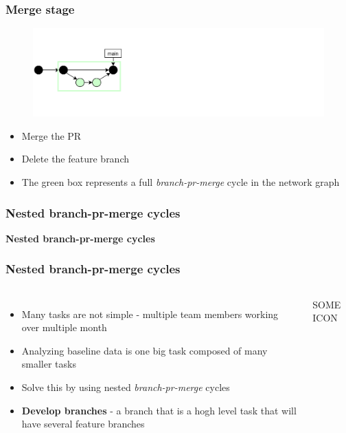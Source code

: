 \documentclass[aspectratio=169]{beamer} %
\begin{document}
\begin{frame}
	\frametitle{Merge stage}
	
	\vspace{-.5cm}
	\begin{minipage}[t][5cm][t]{\textwidth}
		\begin{figure}
			\centering
			\includegraphics[width=\textwidth]{./img/dime-gitflow-network-1-3.png}
		\end{figure}
	\end{minipage}  
	
	\vspace{-.5cm}
	\begin{minipage}[t][5cm][t]{\textwidth}
		\begin{itemize}
			\setlength\itemsep{.5em}
			\item Merge the PR
			\item Delete the feature branch
			\item The green box represents a full \textit{branch-pr-merge} cycle in the network graph
		\end{itemize}
	\end{minipage}  
	
\end{frame}

\begin{frame}
	\frametitle{Nested branch-pr-merge cycles}
	
	\huge\centering \textbf{Nested branch-pr-merge cycles}
	
\end{frame}

\begin{frame}
	\frametitle{Nested branch-pr-merge cycles}
	\begin{columns}[c]
		
		\begin{itemize}
			\setlength\itemsep{.5em}
			\item Many tasks are not simple - multiple team members working over multiple month
			\item Analyzing baseline data is one big task composed of many smaller tasks
			\item Solve this by using nested \textit{branch-pr-merge} cycles
			\item \textbf{Develop branches} - a branch that is a hogh level task that will have several feature branches
		\end{itemize}
		
		\vspace{-.75cm}
		\Large SOME ICON
	\end{columns}
\end{frame}
\end{document}
